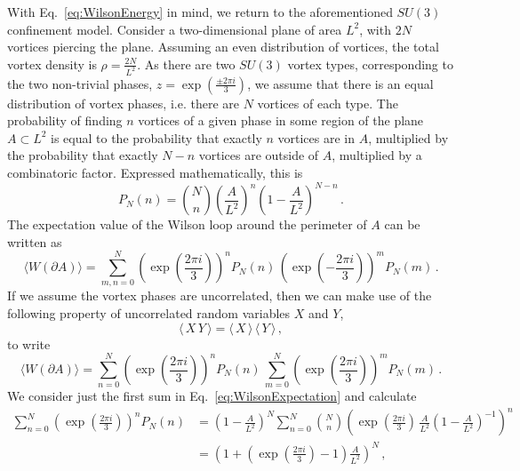 With Eq.~\eqref{eq:WilsonEnergy} in mind, we return to the aforementioned $SU(3)$ confinement model. Consider a two-dimensional plane of area $L^2$, with $2N$ vortices piercing the plane. Assuming an even distribution of vortices, the total vortex density is $\rho = \frac{2N}{L^2}$. As there are two $SU(3)$ vortex types, corresponding to the two non-trivial phases, $z=\exp\left(\frac{\pm 2\pi i}{3}\right)$, we assume that there is an equal distribution of vortex phases, i.e. there are $N$ vortices of each type. The probability of finding $n$ vortices of a given phase in some region of the plane $A\subset L^2$ is equal to the probability that exactly $n$ vortices are in $A$, multiplied by the probability that exactly $N-n$ vortices are outside of $A$, multiplied by a combinatoric factor. Expressed mathematically, this is
%
\begin{equation}
P_N(n) = \binom{N}{n} \left(\frac{A}{L^2}\right)^n \left(1-\frac{A}{L^2}\right)^{N-n}\, .
\end{equation}
%
The expectation value of the Wilson loop around the perimeter of $A$ can be written as
%
\begin{equation}
\langle W(\partial A)\rangle = \sum_{m,n = 0}^N \left(\exp\left(\frac{2\pi i}{3}\right)\right)^n P_N(n)\, \left(\exp\left(-\frac{2\pi i}{3}\right)\right)^m P_N(m)\, .
\end{equation}
%
If we assume the vortex phases are uncorrelated, then we can make use of the following property of uncorrelated random variables $X$ and $Y$,
%
\begin{equation}
\langle\,X\,Y\,\rangle = \langle\,X\,\rangle\,\langle\,Y\,\rangle\, ,
\end{equation}
%
to write
%
\begin{equation}
\langle W(\partial A)\rangle = \sum_{n=0}^N \left(\exp\left(\frac{2\pi i}{3}\right)\right)^n P_N(n)\,\sum_{m=0}^N \left(\exp\left(\frac{2\pi i}{3}\right)\right)^m P_N(m)\, .
\label{eq:WilsonExpectation}
\end{equation}
%
We consider just the first sum in Eq.~\eqref{eq:WilsonExpectation} and calculate
%
\begin{align*}
\sum_{n=0}^N \left(\exp\left(\frac{2\pi i}{3}\right)\right)^n P_N(n) & = \left(1-\frac{A}{L^2}\right)^{N}\sum_{n=0}^{N} \binom{N}{n} \left(\exp\left(\frac{2\pi i}{3}\right)\,\frac{A}{L^2}\left(1-\frac{A}{L^2}\right)^{-1}\right)^n\\
&=\left(1+\left(\exp\left(\frac{2\pi i}{3}\right) - 1\right)\frac{A}{L^2}\right)^N\, ,
\end{align*}

